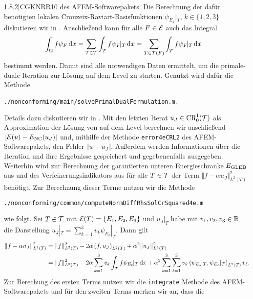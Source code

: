 1.8.2]{CGKNRR10} des AFEM-Softwarepakets.
Die Berechnung der dafür benötigten lokalen Crouzeix-Raviart-Basisfunktionen
$\psi_{E_k}\!|_T$, $k\in\{1,2,3\}$ diskutieren wir in
.
Anschließend kann für alle $F\in\mathcal{E}$ auch das Integral 
\begin{align*}
  \int_\Omega f\psi_F\,\mathrm{d}x
  &=
  \sum_{T\in\mathcal{T}}\int_T f\psi_F\!|_T\,\mathrm{d}x
  =
  \sum_{T\in\mathcal{T}(F)}\int_T f\psi_F\!|_T\,\mathrm{d}x
\end{align*}
bestimmt werden.
Damit sind alle notwendigen Daten ermittelt, um die primale-duale Iteration 
zur Lösung auf dem Level zu starten. Genutzt wird dafür die Methode
\begin{center}
  \texttt{./nonconforming/main/solvePrimalDualFormulation.m}.
\end{center}
Details dazu diskutieren wir in .
Mit den letzten Iterat $u_J\in\textup{CR}^1_0(\mathcal{T})$ als Approximation der Lösung von
 auf dem Level berechnen wir anschließend
$|E(u)-E_\textup{NC}(u_J)|$ und, mithilfe der Methode \texttt{error4eCRL2}
\cite[Abschnitt 1.8.3]{CGKNRR10} des AFEM-Soft\-ware\-pakets, den
Fehler $\Vert u - u_J\Vert$.
Außerdem werden Informationen über die Iteration und ihre Ergebnisse
gespeichert und gegebenenfalls ausgegeben. 
Weiterhin wird zur Berechnung der garantierten unteren Energieschranke $E_\textup{GLEB}$
aus  und des Verfeinerungsindikators aus
 für alle $T\in\mathcal{T}$ der Term $\Vert f-\alpha
u_J\Vert_{L^2(T)}^2$ benötigt.
Zur Berechnung dieser Terme nutzen wir die Methode
\begin{center}
  \texttt{./nonconforming/common/computeNormDiffRhsSolCrSquared4e.m}
\end{center}
wie folgt. 
Sei $T\in\mathcal{T}$ mit $\mathcal{E}(T)=\{E_1,E_2,E_3\}$ und $u_J|_T$ habe mit
$v_1,v_2,v_3\in\mathbb{R}$ die Darstellung $u_J|_T=\sum_{k=1}^3 v_k\psi_{E_k}\!|_T$.
Dann gilt
\begin{align*}
  \Vert f-\alpha u_J\Vert_{L^2(T)}^2 
  &=
  \Vert f\Vert_{L^2(T)}^2 - 2\alpha\left(f,u_J\right)_{L^2(T)} + \alpha^2 \Vert
  u_J\Vert_{L^2(T)}^2\\
  &=
  \Vert f\Vert_{L^2(T)}^2 
  - 2\alpha\sum_{k=1}^3 v_k\int_T f\psi_{E_k}\!|_T\,\mathrm{d}x
  + \alpha^2 \sum_{k=1}^3 \sum_{\ell=1}^3 
  v_k \left(\psi_{E_k}\!|_T,\psi_{E_\ell}|_T\right)_{L^2(T)}v_\ell.
\end{align*}
Zur Berechung des ersten Terms nutzen wir die \texttt{integrate} Methode des
AFEM-Soft\-ware\-pakets und für den zweiten Terms merken wir an, dass die
